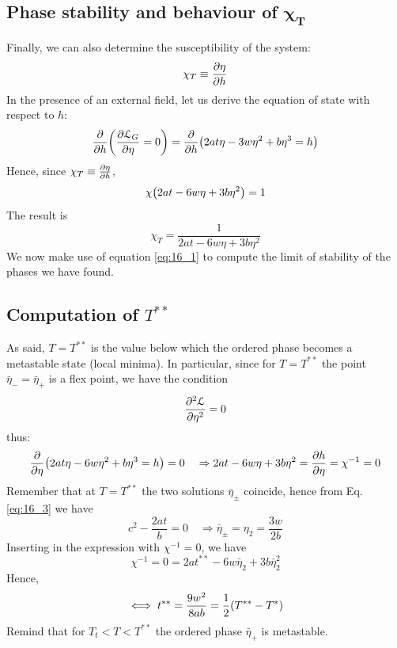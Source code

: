 \documentclass[../main/main.tex]{subfiles}
\begin{document}
\subsection{Phase stability and behaviour of \( \pmb{\chi _T }\)}
Finally, we can also determine the susceptibility of the system:
\begin{equation*}
  \chi _T \equiv \pdv{\eta }{h}
\end{equation*}
In the presence of an external field, let us derive the equation of state with respect to \( h \):
\begin{equation*}
  \pdv{}{h} \qty(\pdv{\mathcal{L}_G}{\eta } = 0 )   = \pdv{}{h} \qty(2 a t \eta - 3 w \eta ^2 +  b \eta ^3 = h)
\end{equation*}
Hence, since \(   \chi _T \equiv \pdv{\eta }{h} \),
\begin{equation*}
   \chi \qty(2 a t - 6 w \eta + 3 b \eta ^2 ) =1
\end{equation*}
The result is
\begin{equation}
  \chi _T = \frac{1}{2 a t - 6 w \eta + 3 b \eta ^2}
  \label{eq:16_1}
\end{equation}
We now make use of equation \eqref{eq:16_1} to compute the limit of stability of the phases we have found.

\subsection{Computation of \( T^{**} \) }
As said, \( T=T^{**} \) is the value below which the ordered phase becomes a metastable state (local minima). In particular, since for \( T=T^{**} \) the point \( \bar{\eta }_-=  \bar{\eta }_+ \) is a flex point, we have the condition
\begin{equation*}
    \pdv[2]{\mathcal{L}}{\eta } = 0
\end{equation*}
thus:
\begin{equation*}
    \pdv{}{\eta } \qty(   2 a t \eta  - 6 w \eta^2 + b \eta ^3 = h ) = 0 \quad  \Rightarrow   2 a t - 6 w \eta + 3b \eta ^2 = \pdv{h}{\eta } =  \chi ^{-1} = 0
\end{equation*}
Remember that at \( T=T^{**} \)  the two solutions \( \bar{\eta }_\pm \) coincide, hence from Eq.\eqref{eq:16_3} we have
\begin{equation*}
  c^2 - \frac{2at}{b} = 0 \quad \Rightarrow \bar{\eta }_\pm = \eta _2 = \frac{3 w}{2 b}
\end{equation*}
Inserting in the expression with \( \chi ^{-1} =0 \), we have
\begin{equation*}
  \chi ^{-1} = 0 = 2 a t^{**} - 6 w \bar{\eta }_2 + 3 b \bar{\eta }_2^2
\end{equation*}
Hence,
\begin{equation}
  \iff t^{**} = \frac{9 w^2}{8 a b} = \frac{1}{2} \qty(T^{**}-T^*)
\end{equation}
Remind that for \( T_t < T < T^{**} \) the ordered phase \( \bar{\eta }_+  \) is metastable.
\end{document}

